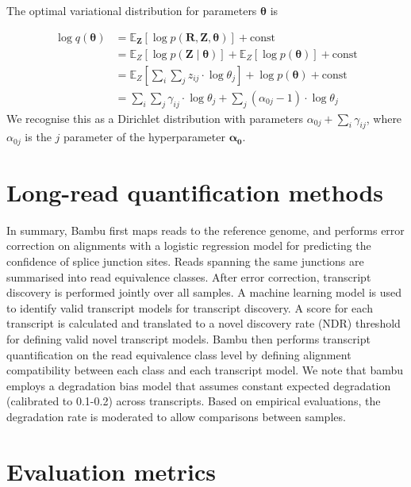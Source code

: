 The optimal variational distribution for parameters $\boldsymbol{\theta}$ is

\begin{equation}
\begin{split}
    \log q(\boldsymbol{\theta})&=\mathbb{E}_{\boldsymbol{Z}}[\log p(\boldsymbol{R}, \boldsymbol{Z}, \boldsymbol{\theta})]+\mathrm{const} \\
    &= \mathbb{E}_{Z}[\log p(\boldsymbol{Z} \mid \boldsymbol{\theta})]+\mathbb{E}_{Z}[\log p(\boldsymbol{\theta})]+\mathrm{const} \\
    &= \mathbb{E}_{Z}\left[\sum_{i} \sum_{j} z_{i j} \cdot \log \theta_{j}\right]+\log p(\boldsymbol{\theta})+\mathrm{const} \\
    &=\sum_{i} \sum_{j} \gamma_{i j} \cdot \log \theta_{j}+\sum_{j}\left(\alpha_{0 j}-1\right) \cdot \log \theta_{j}
\end{split}
\end{equation}
We recognise this as a Dirichlet distribution with parameters $\alpha_{0 j}+\sum_{i} \gamma_{i j}$, where $\alpha_{0j}$ is the $j$ parameter of the hyperparameter $\bm{\alpha_0}$. 

\chapter{Long-read quantification methods}\label{ap:meth}

In summary, Bambu first maps reads to the reference genome, and performs error correction on alignments with a logistic regression model for predicting the confidence of splice junction sites. Reads spanning the same junctions are summarised into read equivalence classes. After error correction, transcript discovery is performed jointly over all samples. A machine learning model is used to identify valid transcript models for transcript discovery. A score for each transcript is calculated and translated to a novel discovery rate (NDR) threshold for defining valid novel transcript models. Bambu then performs transcript quantification on the read equivalence class level by defining alignment compatibility between each class and each transcript model. We note that bambu employs a degradation bias model that assumes constant expected degradation (calibrated to 0.1-0.2) across transcripts. Based on empirical evaluations, the degradation rate is moderated to allow comparisons between samples.   


\chapter{Evaluation metrics}

